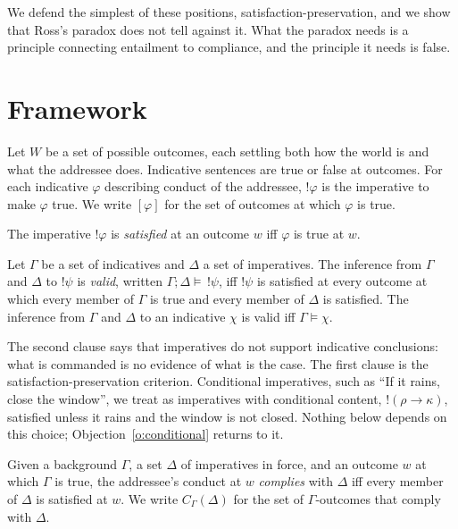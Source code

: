 \documentclass{situationist-preprint}
\begin{document}
We defend the simplest of these positions, satisfaction-preservation, and we show that Ross's paradox does not tell against it. What the paradox needs is a principle connecting entailment to compliance, and the principle it needs is false.

\section{Framework}

Let $W$ be a set of possible outcomes, each settling both how the world is and what the addressee does. Indicative sentences are true or false at outcomes. For each indicative $\varphi$ describing conduct of the addressee, $!\varphi$ is the imperative to make $\varphi$ true. We write $[\varphi]$ for the set of outcomes at which $\varphi$ is true.

\begin{definition}[Satisfaction]\label{d:sat}
The imperative $!\varphi$ is \emph{satisfied} at an outcome $w$ iff $\varphi$ is true at $w$.
\end{definition}

\begin{definition}[Validity]\label{d:valid}
Let $\Gamma$ be a set of indicatives and $\Delta$ a set of imperatives. The inference from $\Gamma$ and $\Delta$ to $!\psi$ is \emph{valid}, written $\Gamma; \Delta \models\, !\psi$, iff $!\psi$ is satisfied at every outcome at which every member of $\Gamma$ is true and every member of $\Delta$ is satisfied. The inference from $\Gamma$ and $\Delta$ to an indicative $\chi$ is valid iff $\Gamma \models \chi$.
\end{definition}

The second clause says that imperatives do not support indicative conclusions: what is commanded is no evidence of what is the case. The first clause is the satisfaction-preservation criterion. Conditional imperatives, such as \enquote{If it rains, close the window}, we treat as imperatives with conditional content, $!(\rho \rightarrow \kappa)$, satisfied unless it rains and the window is not closed. Nothing below depends on this choice; Objection~\ref{o:conditional} returns to it.

\begin{definition}[Compliance]\label{d:comply}
Given a background $\Gamma$, a set $\Delta$ of imperatives in force, and an outcome $w$ at which $\Gamma$ is true, the addressee's conduct at $w$ \emph{complies} with $\Delta$ iff every member of $\Delta$ is satisfied at $w$. We write $C_\Gamma(\Delta)$ for the set of $\Gamma$-outcomes that comply with $\Delta$.
\end{definition}
\end{document}
